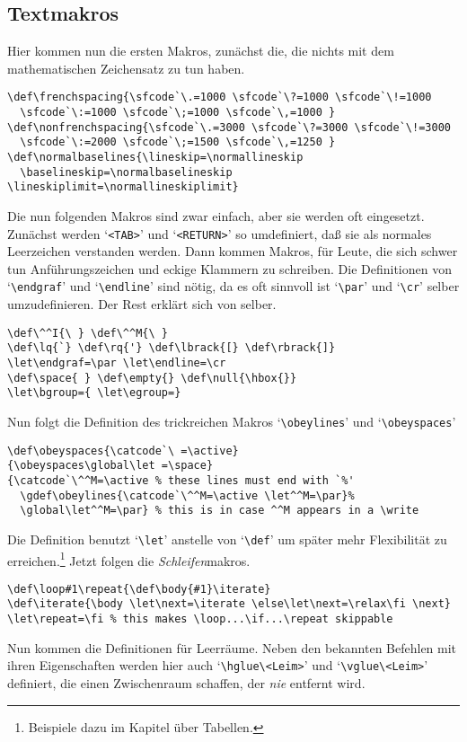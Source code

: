 \begin{appendix}
\subsection{Textmakros}
Hier kommen nun die ersten Makros, zun\"achst die, die nichts mit dem
mathematischen Zeichensatz zu tun haben.
\begin{verbatim}
\def\frenchspacing{\sfcode`\.=1000 \sfcode`\?=1000 \sfcode`\!=1000
  \sfcode`\:=1000 \sfcode`\;=1000 \sfcode`\,=1000 }
\def\nonfrenchspacing{\sfcode`\.=3000 \sfcode`\?=3000 \sfcode`\!=3000
  \sfcode`\:=2000 \sfcode`\;=1500 \sfcode`\,=1250 }
\def\normalbaselines{\lineskip=\normallineskip
  \baselineskip=\normalbaselineskip \lineskiplimit=\normallineskiplimit}
\end{verbatim}
Die nun folgenden Makros sind zwar einfach, aber sie werden oft
eingesetzt. Zun\"achst werden `\verb|<TAB>|' und `\verb|<RETURN>|' so
umdefiniert, da\ss{} sie als normales Leerzeichen verstanden werden. Dann
kommen Makros, f\"ur Leute, die sich schwer tun
Anf\"uhrungszeichen und
eckige Klammern zu schreiben. Die Definitionen von `\verb|\endgraf|'
und `\verb|\endline|' sind n\"otig, da es oft sinnvoll ist `\verb|\par|'
und `\verb|\cr|' selber umzudefinieren. Der Rest erkl\"art sich von
selber.
\begin{verbatim}
\def\^^I{\ } \def\^^M{\ }
\def\lq{`} \def\rq{'} \def\lbrack{[} \def\rbrack{]}
\let\endgraf=\par \let\endline=\cr
\def\space{ } \def\empty{} \def\null{\hbox{}}
\let\bgroup={ \let\egroup=}
\end{verbatim}
Nun folgt die Definition des trickreichen Makros `\verb|\obeylines|'
und `\verb|\obeyspaces|'
\begin{verbatim}
\def\obeyspaces{\catcode`\ =\active}
{\obeyspaces\global\let =\space}
{\catcode`\^^M=\active % these lines must end with `%'
  \gdef\obeylines{\catcode`\^^M=\active \let^^M=\par}%
  \global\let^^M=\par} % this is in case ^^M appears in a \write
\end{verbatim}
Die Definition benutzt `\verb|\let|' anstelle von `\verb|\def|' um
sp\"ater mehr Flexibilit\"at zu erreichen.\footnote{Beispiele dazu
im Kapitel \"uber Tabellen.}
Jetzt folgen die {\em Schleifen}makros.
\begin{verbatim}
\def\loop#1\repeat{\def\body{#1}\iterate}
\def\iterate{\body \let\next=\iterate \else\let\next=\relax\fi \next}
\let\repeat=\fi % this makes \loop...\if...\repeat skippable
\end{verbatim}
Nun kommen die Definitionen f\"ur Leerr\"aume. Neben den bekannten
Befehlen mit ihren Eigenschaften werden hier auch `\verb|\hglue\<Leim>|'
und `\verb|\vglue\<Leim>|' definiert, die einen Zwischenraum schaffen,
der {\em nie} entfernt wird.


\end{appendix}
